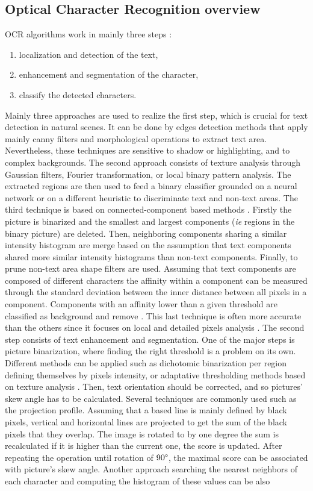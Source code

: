 \documentclass[12pt, french, a4paper]{article} %
\begin{document}
\subsection{Optical Character Recognition overview}
\gls{OCR} algorithms work in mainly three steps \cite{zhang2013text}:
\begin{enumerate}
\itemsep0em 
 \item localization and detection of the text,
 \item enhancement and segmentation of the character,
 \item classify the detected characters.
\end{enumerate}
Mainly three approaches are used to realize the first step, which is crucial for text detection in natural scenes. It can be done by edges detection methods that apply mainly canny filters and morphological operations to extract text area. Nevertheless, these techniques are sensitive to shadow or highlighting, and to complex backgrounds. The second approach consists of texture analysis through Gaussian filters, Fourier transformation, or local binary pattern analysis. The extracted regions are then used to feed a binary classifier grounded on a neural network or on a different heuristic to discriminate text and non-text areas. The third technique is based on connected-component based methods \cite{liu2008robust}. Firstly the picture is binarized and the smallest and largest components (\textit{ie} regions in the binary picture) are deleted. Then, neighboring components sharing a similar intensity histogram are merge based on the assumption that text components shared more similar intensity histograms than non-text components. Finally, to prune non-text area shape filters are used. Assuming that text components are composed of different characters the affinity within a component can be measured through the standard deviation between the inner distance between all pixels in a component. Components with an affinity lower than a given threshold are classified as background and remove \cite{liu2008robust}. This last technique is often more accurate than the others since it focuses on local and detailed pixels analysis \cite{zhang2013text}. The second step consists of text enhancement and segmentation. One of the major steps is picture binarization, where finding the right threshold is a problem on its own. Different methods can be applied such as dichotomic binarization per region defining themselves by pixels intensity, or adaptative thresholding methods based on texture analysis \cite{zhang2013text}. Then, text orientation should be corrected, and so pictures' skew angle has to be calculated. Several techniques are commonly used such as the projection profile. Assuming that a based line is mainly defined by black pixels, vertical and horizontal lines are projected to get the sum of the black pixels that they overlap. The image is rotated to by one degree the sum is recalculated if it is higher than the current one, the score is updated. After repeating the operation until rotation of $90\degree$, the maximal score can be associated with picture's skew angle. Another approach searching the nearest neighbors of each character and computing the histogram of these values can be also 
\end{document}
